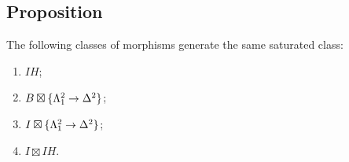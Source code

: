     \subsection{Proposition}\label{chVI-2-2}
        The following classes of morphisms generate the same saturated class:
        \begin{enumerate}[label=\roman*)]
            \item 
                $I H$;
            \item 
                $B \boxtimes \{ \Lambda^{2}_{1} \to \Delta^2 \}$;
            \item 
                $I \boxtimes \{ \Lambda^{2}_{1} \to \Delta^2 \}$;
            \item 
                $I \boxtimes I H$.
        \end{enumerate}
        \smallskip

